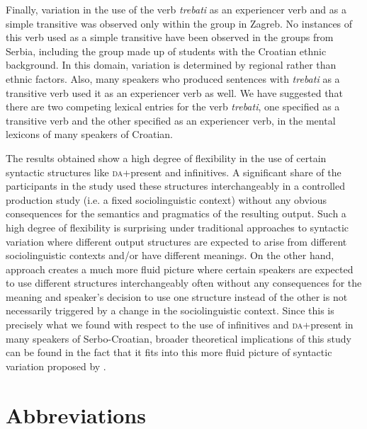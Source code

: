 \documentclass[output=paper,
modfonts,
newtxmath,
hidelinks,
]{langscibook}
\begin{document}
Finally, variation in the use of the verb \textit{trebati} as an experiencer verb and as a simple transitive was observed only within the group in Zagreb. No instances of this verb used as a simple transitive have been observed in the groups from Serbia, including the group made up of students with the Croatian ethnic background. In this domain, variation is determined by regional rather than ethnic factors. Also, many speakers who produced sentences with \textit{trebati} as a transitive verb used it as an experiencer verb as well. We have suggested that there are two competing lexical entries for the verb \textit{trebati}, one specified as a transitive verb and the other specified as an experiencer verb, in the mental lexicons of many speakers of Croatian. 

The results obtained show a high degree of flexibility in the use of certain syntactic structures like \textsc{da}+present and infinitives. A significant share of the participants in the study used these structures interchangeably in a controlled production study (i.e. a fixed sociolinguistic context) without any obvious consequences for the semantics and pragmatics of the resulting output. Such a high degree of flexibility is surprising under traditional approaches to syntactic variation where different output structures are expected to arise from different sociolinguistic contexts and/or have different meanings. On the other hand,  approach creates a much more fluid picture where certain speakers are expected to use different structures interchangeably often without any consequences for the meaning and speaker’s decision to use one structure instead of the other is not necessarily triggered by a change in the sociolinguistic context. Since this is precisely what we found with respect to the use of infinitives and \textsc{da}+present in many speakers of Serbo-Croatian, broader theoretical implications of this study can be found in the fact that it fits into this more fluid picture of syntactic variation proposed by \citet{Adger2006}.


\section*{Abbreviations}
\end{document}
